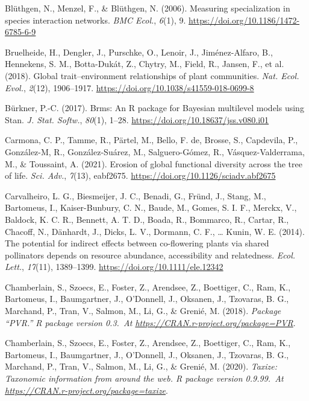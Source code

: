\documentclass[
  12pt,
  a4paper,
]{article}
\newlength{\cslhangindent}
\newlength{\cslentryspacingunit} %
\newenvironment{CSLReferences}[2] %
 {%
  \setlength{\parindent}{0pt}
  \ifodd #1
  \let\oldpar\par
  \def\par{\hangindent=\cslhangindent\oldpar}
  \fi
  \setlength{\parskip}{#2\cslentryspacingunit}
 }%
 {}
\begin{document}
\begin{CSLReferences}{1}{0}
\leavevmode{}%
Blüthgen, N., Menzel, F., \& Blüthgen, N. (2006). Measuring specialization in species interaction networks. \emph{BMC Ecol.}, \emph{6}(1), 9. \url{https://doi.org/10.1186/1472-6785-6-9}

\leavevmode{}%
Bruelheide, H., Dengler, J., Purschke, O., Lenoir, J., Jiménez-Alfaro, B., Hennekens, S. M., Botta-Dukát, Z., Chytry, M., Field, R., Jansen, F., et al. (2018). Global trait--environment relationships of plant communities. \emph{Nat. Ecol. Evol.}, \emph{2}(12), 1906--1917. \url{https://doi.org/10.1038/s41559-018-0699-8}

\leavevmode{}%
Bürkner, P.-C. (2017). Brms: {An R} package for {Bayesian} multilevel models using {Stan}. \emph{J. Stat. Softw.}, \emph{80}(1), 1--28. \url{https://doi.org/10.18637/jss.v080.i01}

\leavevmode{}%
Carmona, C. P., Tamme, R., Pärtel, M., Bello, F. de, Brosse, S., Capdevila, P., González-M, R., González-Suárez, M., Salguero-Gómez, R., Vásquez-Valderrama, M., \& Toussaint, A. (2021). Erosion of global functional diversity across the tree of life. \emph{Sci. Adv.}, \emph{7}(13), eabf2675. \url{https://doi.org/10.1126/sciadv.abf2675}

\leavevmode{}%
Carvalheiro, L. G., Biesmeijer, J. C., Benadi, G., Fründ, J., Stang, M., Bartomeus, I., Kaiser-Bunbury, C. N., Baude, M., Gomes, S. I. F., Merckx, V., Baldock, K. C. R., Bennett, A. T. D., Boada, R., Bommarco, R., Cartar, R., Chacoff, N., Dänhardt, J., Dicks, L. V., Dormann, C. F., \ldots{} Kunin, W. E. (2014). The potential for indirect effects between co-flowering plants via shared pollinators depends on resource abundance, accessibility and relatedness. \emph{Ecol. Lett.}, \emph{17}(11), 1389--1399. \url{https://doi.org/10.1111/ele.12342}

\leavevmode{}%
Chamberlain, S., Szoecs, E., Foster, Z., Arendsee, Z., Boettiger, C., Ram, K., Bartomeus, I., Baumgartner, J., O'Donnell, J., Oksanen, J., Tzovaras, B. G., Marchand, P., Tran, V., Salmon, M., Li, G., \& Grenié, M. (2018). \emph{Package {``{PVR}.''} R package version 0.3.~At \href{https://CRAN.R-project.org/package=PVR}{https://CRAN.r-project.org/package=PVR}}.

\leavevmode{}%
Chamberlain, S., Szoecs, E., Foster, Z., Arendsee, Z., Boettiger, C., Ram, K., Bartomeus, I., Baumgartner, J., O'Donnell, J., Oksanen, J., Tzovaras, B. G., Marchand, P., Tran, V., Salmon, M., Li, G., \& Grenié, M. (2020). \emph{Taxize: {Taxonomic} information from around the web. R package version 0.9.99.~At \href{https://CRAN.R-project.org/package=taxize}{https://CRAN.r-project.org/package=taxize}}.


\end{CSLReferences}
\end{document}
